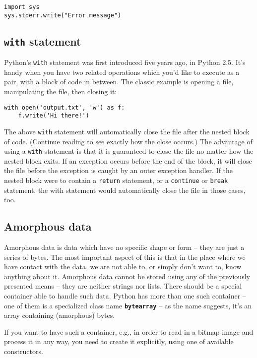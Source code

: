 \documentclass[11pt]{article}
\begin{document}
\begin{verbatim}
import sys
sys.stderr.write("Error message")
\end{verbatim}


\subsection{\texttt{with} statement}
\label{sec:orga48c6b1}
Python’s \texttt{with} statement was first introduced five years ago, in Python
2.5. It’s handy when you have two related operations which you’d like
to execute as a pair, with a block of code in between. The classic
example is opening a file, manipulating the file, then closing it:

\begin{verbatim}
with open('output.txt', 'w') as f:
    f.write('Hi there!')
\end{verbatim}

The above \texttt{with} statement will automatically close the file after the
nested block of code. (Continue reading to see exactly how the close
occurs.) The advantage of using a \texttt{with} statement is that it is
guaranteed to close the file no matter how the nested block exits. If
an exception occurs before the end of the block, it will close the
file before the exception is caught by an outer exception handler. If
the nested block were to contain a \texttt{return} statement, or a \texttt{continue}
or \texttt{break} statement, the with statement would automatically close the
file in those cases, too.

\newpage


\subsection{Amorphous data}
\label{sec:orgdbba8ab}
Amorphous data is data which have no specific shape or form – they are
just a series of bytes. The most important aspect of this is that in
the place where we have contact with the data, we are not able to, or
simply don’t want to, know anything about it. Amorphous data cannot be
stored using any of the previously presented means – they are neither
strings nor lists. There should be a special container able to handle
such data. Python has more than one such container – one of them is a
specialized class name \textbf{\texttt{bytearray}} – as the name suggests, it’s an array
containing (amorphous) bytes.

If you want to have such a container, e.g., in order to read in a
bitmap image and process it in any way, you need to create it
explicitly, using one of available constructors.
\end{document}
